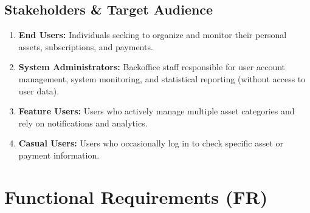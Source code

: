 \documentclass[11pt, a4paper]{article}
\begin{document}
	\subsection{Stakeholders \& Target Audience}
	\begin{enumerate}
		\item \textbf{End Users:} Individuals seeking to organize and monitor their personal assets, subscriptions, and payments.
		\item \textbf{System Administrators:} Backoffice staff responsible for user account management, system monitoring, and statistical reporting (without access to user data).
		\item \textbf{Feature Users:} Users who actively manage multiple asset categories and rely on notifications and analytics.
		\item \textbf{Casual Users:} Users who occasionally log in to check specific asset or payment information.
	\end{enumerate}
	
	
	\section{Functional Requirements (FR)}
	
\end{document}
